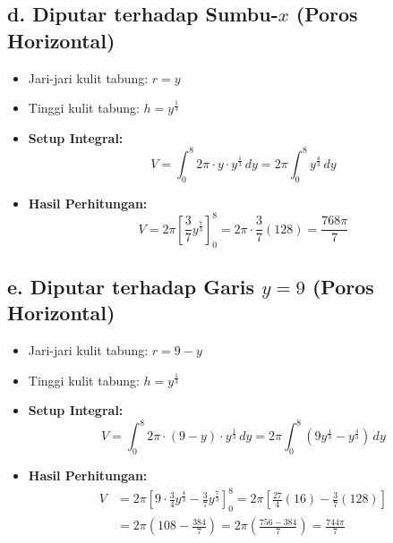 \documentclass[12pt,a4paper]{article}
\begin{document}
\subsection*{d. Diputar terhadap Sumbu-$x$ (Poros Horizontal)}
\begin{itemize}
  \item Jari-jari kulit tabung: $r = y$
  \item Tinggi kulit tabung: $h = y^{\frac{1}{3}}$
  \item \textbf{Setup Integral:}
    \begin{equation*}
      V = \int_{0}^{8} 2\pi \cdot y \cdot y^{\frac{1}{3}} \, dy = 2\pi \int_{0}^{8} y^{\frac{4}{3}} \, dy
    \end{equation*}
  \item \textbf{Hasil Perhitungan:}
    \begin{equation*}
      V = 2\pi \left[ \frac{3}{7}y^{\frac{7}{3}} \right]_{0}^{8} = 2\pi \cdot \frac{3}{7} (128) = \frac{768\pi}{7}
    \end{equation*}
\end{itemize}

\subsection*{e. Diputar terhadap Garis $y = 9$ (Poros Horizontal)}
\begin{itemize}
  \item Jari-jari kulit tabung: $r = 9 - y$
  \item Tinggi kulit tabung: $h = y^{\frac{1}{3}}$
  \item \textbf{Setup Integral:}
    \begin{equation*}
      V = \int_{0}^{8} 2\pi \cdot (9 - y) \cdot y^{\frac{1}{3}} \, dy = 2\pi \int_{0}^{8} (9y^{\frac{1}{3}} - y^{\frac{4}{3}}) \, dy
    \end{equation*}
  \item \textbf{Hasil Perhitungan:}
    \begin{align*}
      V &= 2\pi \left[ 9 \cdot \frac{3}{4}y^{\frac{4}{3}} - \frac{3}{7}y^{\frac{7}{3}} \right]_{0}^{8} = 2\pi \left[ \frac{27}{4}(16) - \frac{3}{7}(128) \right] \\
      &= 2\pi \left( 108 - \frac{384}{7} \right) = 2\pi \left( \frac{756 - 384}{7} \right) = \frac{744\pi}{7}
    \end{align*}
\end{itemize}
\end{document}
